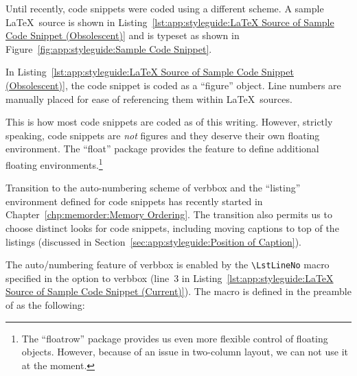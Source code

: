 Until recently, code snippets were coded using a different scheme.
A sample \LaTeX\ source is shown in
Listing~\ref{lst:app:styleguide:LaTeX Source of Sample Code Snippet (Obsolescent)}
and is typeset as shown in
Figure~\ref{fig:app:styleguide:Sample Code Snippet}.

\begin{listing}[tbh]
{ \scriptsize
{}
}
\centering
\theverbbox
\caption{\LaTeX\ Source of Sample Code Snippet (Obsolescent)}
\label{lst:app:styleguide:LaTeX Source of Sample Code Snippet (Obsolescent)}
\end{listing}



In Listing~\ref{lst:app:styleguide:LaTeX Source of Sample Code Snippet (Obsolescent)},
the code snippet is coded as a ``figure'' object.
Line numbers are manually placed for ease of referencing them within
\LaTeX\ sources.

This is how most code snippets are coded as of this writing.
However, strictly speaking, code snippets are \emph{not} figures
and they deserve their own floating environment.
The ``float'' package provides the feature to define additional
floating environments.\footnote{
  The ``floatrow'' package provides us even more flexible
  control of floating objects. However, because of an issue
  in two-column layout, we can not use it at the moment.}

Transition to the auto-numbering scheme of verbbox and
the ``listing'' environment defined for code snippets
has recently started in
Chapter~\ref{chp:memorder:Memory Ordering}.
The transition also permits us to choose distinct looks
for code snippets, including moving captions to top of the
listings
(discussed in Section~\ref{sec:app:styleguide:Position of Caption}).

The auto\-/numbering feature of verbbox is enabled by
the \verb|\LstLineNo| macro specified in the option to verbbox
(line~3 in
Listing~\ref{lst:app:styleguide:LaTeX Source of Sample Code Snippet (Current)}).
The macro is defined in the preamble of 
as the following:

\noindent\begin{minipage}{\columnwidth}
{ \scriptsize
\begin{verbbox}
\newcommand{\LstLineNo}
  {\makebox[5ex][r]{\arabic{VerbboxLineNo}\hspace{2ex}}}
\end{verbbox}
}
\vspace{10pt}
\centering
\theverbbox
\vspace{10pt}
\end{minipage}

